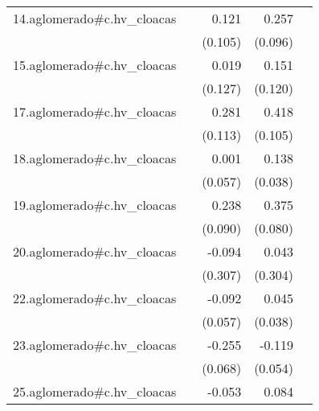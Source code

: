 {\begin{longtable}{l*{4}{D{.}{.}{-1}}}
\addlinespace
14.aglomerado#c.hv\_cloacas&                     &       0.121         &       0.257\sym{**} &                     \\
            &                     &     (0.105)         &     (0.096)         &                     \\
\addlinespace
15.aglomerado#c.hv\_cloacas&                     &       0.019         &       0.151         &                     \\
            &                     &     (0.127)         &     (0.120)         &                     \\
\addlinespace
17.aglomerado#c.hv\_cloacas&                     &       0.281\sym{*}  &       0.418\sym{***}&                     \\
            &                     &     (0.113)         &     (0.105)         &                     \\
\addlinespace
18.aglomerado#c.hv\_cloacas&                     &       0.001         &       0.138\sym{***}&                     \\
            &                     &     (0.057)         &     (0.038)         &                     \\
\addlinespace
19.aglomerado#c.hv\_cloacas&                     &       0.238\sym{**} &       0.375\sym{***}&                     \\
            &                     &     (0.090)         &     (0.080)         &                     \\
\addlinespace
20.aglomerado#c.hv\_cloacas&                     &      -0.094         &       0.043         &                     \\
            &                     &     (0.307)         &     (0.304)         &                     \\
\addlinespace
22.aglomerado#c.hv\_cloacas&                     &      -0.092         &       0.045         &                     \\
            &                     &     (0.057)         &     (0.038)         &                     \\
\addlinespace
23.aglomerado#c.hv\_cloacas&                     &      -0.255\sym{***}&      -0.119\sym{*}  &                     \\
            &                     &     (0.068)         &     (0.054)         &                     \\
\addlinespace
25.aglomerado#c.hv\_cloacas&                     &      -0.053         &       0.084         &                     \\

\end{longtable}}
